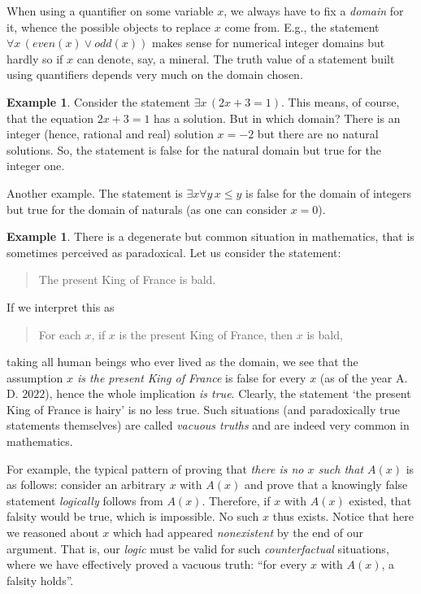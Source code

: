 \documentclass[12pt,notitlepage]{article}
\theoremstyle{plain}
\theoremstyle{definition}
\newtheorem{exm}[thm]{Example}
\theoremstyle{plain}
\newcommand{\1}{\mathbf{1}}
\newcommand{\0}{\mathbf{0}}
\newcommand{\mcomm}[1]{}
\begin{document}
When using a quantifier on some variable $x$, we always have to fix a \emph{domain} for it, whence the possible objects to replace $x$ come from. E.g., the statement $\forall x\, ( even(x) \vee odd(x))$ makes sense for numerical integer domains but hardly so if $x$ can denote, say, a mineral. The truth value of a statement built using quantifiers depends very much on the domain chosen.

\begin{exm}
Consider the statement $\exists x\, (2 x + 3 = 1)$. This means, of course, that the equation $2x + 3 = 1$ has a solution. But in which domain? There is an integer (hence, rational and real) solution $x = -2$ but there are no natural solutions. So, the statement is false for the natural domain but true for the integer one.

Another example. The statement is $\exists x \forall y\, x \leq y$ is false for the domain of integers but true for the domain of naturals (as one can consider $x = 0$).
\end{exm}

\begin{exm}\label{exm_vacuous}
There is a degenerate but common situation in mathematics, that is sometimes perceived as paradoxical. Let us consider the statement:
\begin{quote}
The present King of France is bald.
\end{quote}
If we interpret this as 
\begin{quote}
For each $x$, if $x$ is the present King of France, then $x$ is bald,
\end{quote}
taking all human beings who ever lived as the domain, we see that the assumption \emph{$x$ is the present King of France} is false for every $x$ (as of the year A.\,D. $2022$), hence the whole implication \emph{is true}. Clearly, the statement `the present King of France is hairy' is no less true. Such situations (and paradoxically true statements themselves) are called \emph{vacuous truths}  and are indeed very common in mathematics.

For example, the typical pattern of proving that \emph{there is no $x$ such that $A(x)$} is as follows: consider an arbitrary $x$ with $A(x)$ and prove that a knowingly false statement \emph{logically} follows from $A(x)$. Therefore, if $x$ with $A(x)$ existed, that falsity would be true, which is impossible. No such $x$ thus exists. Notice that here we reasoned about $x$ which had appeared \emph{nonexistent} by the end of our argument. That is, our \emph{logic} must be valid for such \emph{counterfactual} situations, where we have effectively proved a vacuous truth: ``for every $x$ with $A(x)$, a falsity holds''. 
\end{exm}
\mcomm{The Instructor might add that vacuous truths may sound very logical, like \emph{every round square is round}, or be vacuous for a certain parameter value (still being true for all its values), like \emph{every finite set of integers has an upper bound}. So, they are not mere fruits of an idle mind but a necessity.}
\end{document}
